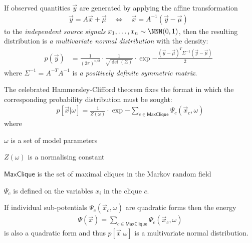 \documentclass[landscape,footrule]{foils}
\begin{document}

If observed quantities $\vec{y}$ are generated by applying the affine transformation 
\begin{align*}
 \vec{y}=A\vec{x}+\vec{\mu}\quad\Leftrightarrow\quad \vec{x}=A^{-1}(\vec{y}-\vec{\mu})\enspace
\end{align*}
to the \emph{independent source signals} $x_1,\ldots, x_n\sim\NNN(0,1)$, then the resulting distribution is \emph{a multivariate normal distribution} with the density:
\begin{align*}
p(\vec{y})&=\frac{1}{(2\pi)^{n/2}}\cdot\frac{1}{\sqrt{\det(\Sigma)}}\cdot
\exp{-\frac{(\vec{y}-\vec{\mu})^T \Sigma^{-1}(\vec{y}-\vec{\mu})}{2}}\enspace
\end{align*} 
where $\Sigma^{-1}=A^{-T}A^{-1}$ is \emph{a positively definite symmetric matrix}.






The celebrated Hammersley-Clifford theorem fixes the format in which the corresponding probability distribution must be sought:
\begin{align*}
p[\vec{x}|\omega]=\frac{1}{Z(\omega)}\cdot\exp{-\sum_{c\in\textsf{MaxClique}}\Psi_c(\vec{x}_c,\omega)} 
\end{align*} 
where 
\begin{triangles}
\item $\omega$ is a set of model parameters
\item $Z(\omega)$ is a normalising constant
\item $\textsf{MaxClique}$ is the set of maximal cliques in the Markov random field
\item $\Psi_c$ is defined on the variables $x_i$ in the clique $c$. 
\end{triangles}


If individual sub-potentials $\Psi_c(\vec{x}_c,\omega)$ are quadratic forms then the energy 
\begin{align*}
\Psi(\vec{x})=\sum_{c\in\textsf{MaxClique}}\Psi_c(\vec{x}_c,\omega) 
\end{align*} 
is also a quadratic form and thus $p[\vec{x}|\omega]$ is a multivariate normal distribution.\vspace*{1cm}
\end{document}
